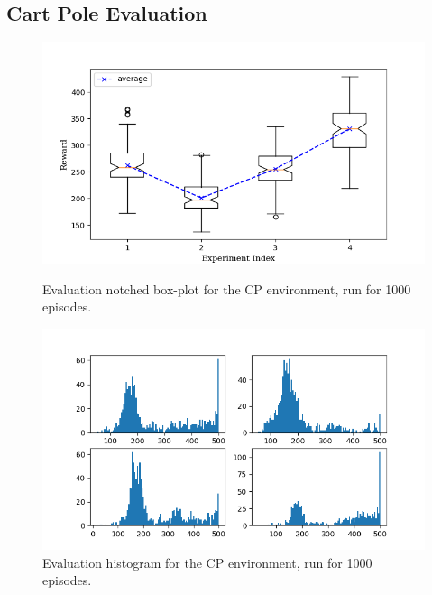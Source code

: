 \documentclass[hidelinks,journal]{IEEEtran}
\begin{document}
\begin{appendices}
\subsection{Cart Pole Evaluation}
\begin{figure}[!h]
  \centering
  \includegraphics[scale=1]{graph/cpEvalBox.png}
  \caption{Evaluation notched box-plot for the CP environment, run for 1000 episodes.}
  \includegraphics[scale=1]{graph/cpEvalHist.png}
  \caption{Evaluation histogram for the CP environment, run for 1000 episodes.}
\end{figure}
\pagebreak


\end{appendices}
\end{document}
